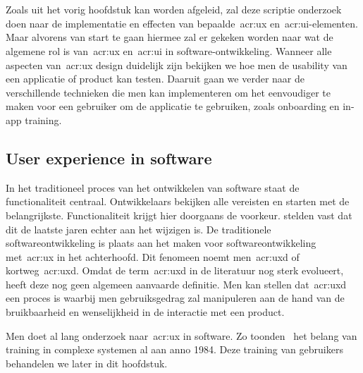 \chapter{}
\label{ch:stand-van-zaken}


Zoals uit het vorig hoofdstuk kan worden afgeleid, zal deze scriptie onderzoek doen naar de implementatie en effecten van bepaalde~\acrshort{acr:ux} en~\acrshort{acr:ui}-elementen. Maar alvorens van start te gaan hiermee zal er gekeken worden naar wat de algemene rol is van~\acrshort{acr:ux} en~\acrshort{acr:ui} in software-ontwikkeling. Wanneer alle aspecten van~\acrshort{acr:ux} design duidelijk zijn bekijken we hoe men de usability van een applicatie of product kan testen. Daaruit gaan we verder naar de verschillende technieken die men kan implementeren om het eenvoudiger te maken voor een gebruiker om de applicatie te gebruiken, zoals onboarding en in-app training.

\section{User experience in software}
\label{sec:user-experience-in-software}

In het traditioneel proces van het ontwikkelen van software staat de functionaliteit centraal. Ontwikkelaars bekijken alle vereisten en starten met de belangrijkste. Functionaliteit krijgt hier doorgaans de voorkeur. \textcite{Harutyunyan2019} stelden vast dat dit de laatste jaren echter aan het wijzigen is. De traditionele softwareontwikkeling is plaats aan het maken voor softwareontwikkeling met~\acrlong{acr:ux} in het achterhoofd. Dit fenomeen noemt men~\acrfull{acr:uxd} of kortweg~\acrshort{acr:uxd}. Omdat de term~\acrshort{acr:uxd} in de literatuur nog sterk evolueert, heeft deze nog geen algemeen aanvaarde definitie. Men kan stellen dat~\acrlong{acr:uxd} een proces is waarbij men gebruiksgedrag zal manipuleren aan de hand van de bruikbaarheid en wenselijkheid in de interactie met een product.

Men doet al lang onderzoek naar~\acrlong{acr:ux} in software. Zo toonden~\textcite{Carroll1984} het belang van training in complexe systemen al aan anno 1984. Deze training van gebruikers behandelen we later in dit hoofdstuk.

